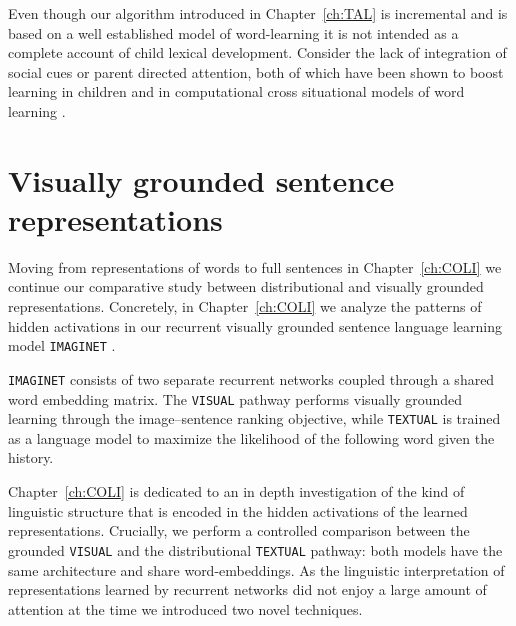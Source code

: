 Even though our algorithm introduced in Chapter~\ref{ch:TAL} is incremental
and is based on a well established model of word-learning \citep{fazly.etal.10} it is not intended as a
complete account of child lexical development. Consider 
the lack of integration of social cues or parent directed attention, both of which 
have been shown to boost learning in children 
\citep{gleitman1990structural,tomasello1995two} and in computational cross situational
models of word learning \citep{yu2007unified,lazaridou2016multimodal}.

\section{Visually grounded sentence representations}
Moving from representations of words to full sentences in Chapter~\ref{ch:COLI} we continue
our comparative study between distributional and visually grounded representations. 
Concretely, in Chapter~\ref{ch:COLI} we analyze the patterns of hidden activations in 
our recurrent visually grounded sentence language learning model 
\texttt{IMAGINET} \citep{chrupala2015learning}. 

\texttt{IMAGINET} consists of two separate recurrent networks coupled through a 
shared word embedding matrix. The \texttt{VISUAL}
pathway performs visually grounded learning through the image--sentence ranking objective, 
while \texttt{TEXTUAL} is trained as a language model to maximize the likelihood of the following word
given the history.


Chapter~\ref{ch:COLI} is dedicated to an in depth investigation
of the kind of linguistic structure that is encoded in the hidden activations of the learned representations. 
Crucially, we perform a controlled comparison between the grounded \texttt{VISUAL} and the distributional 
 \texttt{TEXTUAL} pathway: both models have the same architecture and share word-embeddings.
 As the linguistic interpretation of representations learned by recurrent networks did not enjoy a 
 large amount of  attention at the time we introduced two novel techniques. 
 
